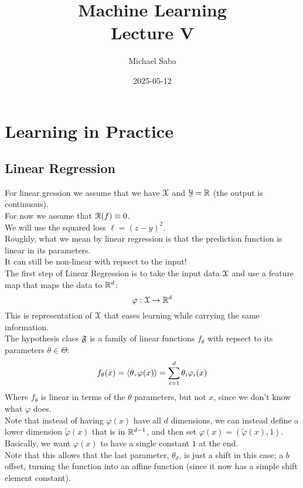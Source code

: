 \documentclass[12pt]{article}
\title{%
    \Huge Machine Learning \\
    \Large Lecture V
}
\date{2025-05-12}
\author{Michael Saba}
\begin{document}
\maketitle
\newpage
\setlength{\parindent}{0pt}

\section*{Learning in Practice}

\subsection*{Linear Regression}

For linear gression we assume that
we have $\mathcal{X}$ and $\mathcal{Y} = \mathbb{R}$
(the output is continuous). \\

For now we assume that $\mathcal{R}(f) \equiv 0$. \\

We will use the squared loss $\ell = (z- y)^2$. \\

Roughly, what we mean by linear regression is that
the prediction function is linear in its parameters. \\
It can still be non-linear with repsect to
the input! \\

The first step of Linear Regression is 
to take the input data $\mathcal{X}$ and use a feature
map that maps the data to $\mathbb{R}^d$:
\[ \varphi: \mathcal{X} \to \mathbb{R}^d \]
This is representation of $\mathcal{X}$ 
that eases learning while carrying the same
information. \\

The hypothesis class $\mathfrak{F}$ is a family of
linear functions $f_\theta$ with
repsect to its parameters $\theta \in \Theta$:
\[ f_\theta(x) = \left\langle \theta, \varphi(x) \right\rangle
= \sum_{i = 1}^d \theta_i \varphi_i(x) \]
Where $f_\theta$ is linear in terms of the
$\theta$ parameters, but not $x$,
since we don't know what $\varphi$ does. \\

Note that instead of having $\varphi(x)$
have all $d$ dimensions, we can instead define
a lower dimension $\tilde{\varphi}(x)$
that is in $\mathbb{R}^{d-1}$,
and then set $\varphi(x) = (\tilde{\varphi}(x), 1)$. \\
Basically, we want $\varphi(x)$ to have
a single constant $1$ at the end. \\
Note that this allows that the last parameter,
$\theta_d$, is just a shift in this case;
a $b$ offset,
turning the function into an affine function
(since it now has a simple shift element constant). \\
\end{document}
